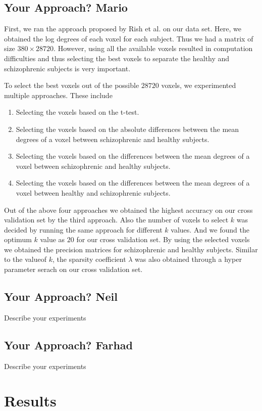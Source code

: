\documentclass{article} %
\begin{document}
\subsection{Your Approach? Mario}
First, we ran the approach proposed by Rish et al. \cite{Rish_2013} on our data set. Here, we obtained the log degrees of each voxel for each subject. Thus we had a matrix of size  $380 \times 28720$. However, using all the available voxels resulted in computation difficulties and thus selecting the best voxels to separate the healthy and schizophrenic subjects is very important. 

To select the best voxels out of the possible $28720$ voxels, we experimented multiple approaches. These include \begin{enumerate}
  \item Selecting the voxels based on the t-test.
  \item Selecting the voxels based on the absolute differences between the mean degrees of a voxel between schizophrenic and healthy subjects.
  \item Selecting the voxels based on the differences between the mean degrees of a voxel between schizophrenic and healthy subjects.
  \item Selecting the voxels based on the differences between the mean degrees of a voxel between healthy and schizophrenic subjects.
\end{enumerate}
Out of the above four approaches we obtained the highest accuracy on our cross validation set by the third approach. Also the number of voxels to select $k$ was decided by running the same approach for different $k$ values. And we found the optimum $k$ value as $20$ for our cross validation set. By using the selected voxels we obtained the precision matrices for schizophrenic and healthy subjects. Similar to the valueof $k$, the sparsity coefficient $\lambda$ was also obtained through a hyper parameter serach on our cross validation set.
\subsection{Your Approach? Neil}
Describe your experiments

\subsection{Your Approach? Farhad}
Describe your experiments

\section{Results}
\end{document}

